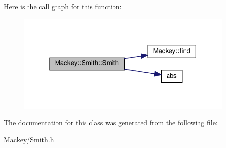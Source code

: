 Here is the call graph for this function\+:\nopagebreak
\begin{figure}[H]
\begin{center}
\leavevmode
\includegraphics[width=303pt]{classMackey_1_1Smith_a612e73ee01325c7adf0b7102d007a915_cgraph}
\end{center}
\end{figure}


The documentation for this class was generated from the following file\+:\begin{DoxyCompactItemize}
\item 
Mackey/\hyperlink{Smith_8h}{Smith.\+h}\end{DoxyCompactItemize}
